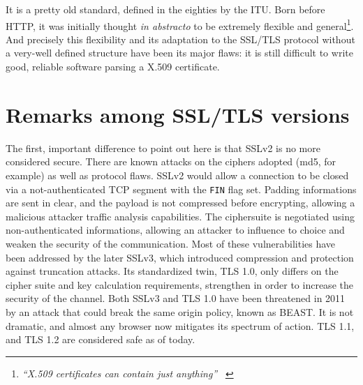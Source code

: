 It is a pretty old standard, defined in the eighties by the ITU.
Born before HTTP, it was initially thought \emph{in abstracto} to be
extremely flexible and general\footnote{
  \textit{``X.509 certificates can contain just anything''} ~\cite{SSLiverse}
}.
And precisely this flexibility and its adaptation to the SSL/TLS protocol
without a very-well defined structure have been its major flaws: it is still
difficult to write good, reliable software parsing a X.509 certificate.

\section{Remarks among SSL/TLS versions}

The first, important difference to point out here is that SSLv2 is no more
considered secure. There are known attacks on the ciphers adopted (md5, for
example) as well as protocol flaws.
SSLv2 would allow a connection to be closed via a not-authenticated TCP segment
with the \texttt{FIN} flag set. Padding informations are sent in clear, and the
payload is not compressed before encrypting, allowing a malicious attacker
traffic analysis capabilities. The ciphersuite is negotiated using
non-authenticated informations, allowing an attacker to influence to choice and
weaken the security of the communication.
Most of these vulnerabilities have been addressed by the later SSLv3, which
introduced compression and protection against truncation attacks.
Its standardized twin, TLS 1.0, only differs on the cipher suite and key
calculation requirements, strengthen in order to increase the security of the
channel.
Both SSLv3 and TLS 1.0 have been threatened in 2011 by an attack that could break
the same origin policy, known as BEAST. It is not dramatic, and almost any
browser now mitigates its spectrum of action.
TLS 1.1, and TLS 1.2 are considered safe as of today.

